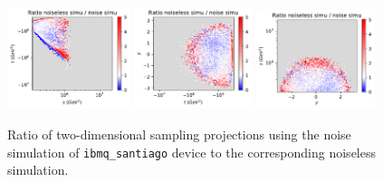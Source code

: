 \documentclass[twocolumn,preprintnumbers,superscriptaddress]{revtex4-2}
\begin{document}
\begin{figure}

  \includegraphics[width=0.32\textwidth]{plots/hardware_noise_simulation/s-t_RATIO_100k_noiseless-noise.pdf}%
  \includegraphics[width=0.305\textwidth]{plots/hardware_noise_simulation/t-y_RATIO_100k_noiseless-noise.pdf}%
  \includegraphics[width=0.31\textwidth]{plots/hardware_noise_simulation/y-s_RATIO_100k_noiseless-noise.pdf}

  \caption{\label{fig:ibmnoise2}Ratio of two-dimensional sampling projections using the noise simulation of {\tt ibmq\_santiago} device to the
    corresponding noiseless simulation.}
\end{figure}

\clearpage


\end{document}
